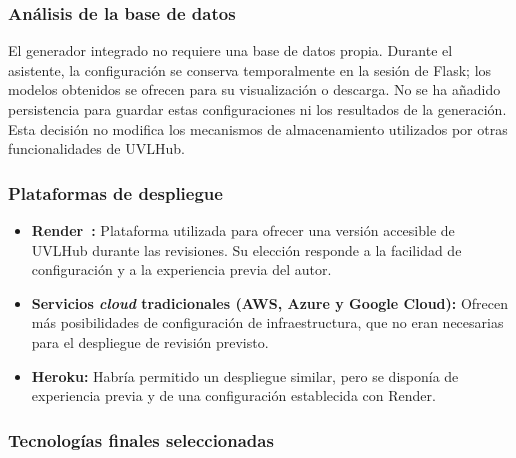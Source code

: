\subsubsection*{Análisis de la base de datos}

El generador integrado no requiere una base de datos propia. Durante el
asistente, la configuración se conserva temporalmente en la sesión de Flask;
los modelos obtenidos se ofrecen para su visualización o descarga. No se ha
añadido persistencia para guardar estas configuraciones ni los resultados de
la generación. Esta decisión no modifica los mecanismos de almacenamiento
utilizados por otras funcionalidades de UVLHub.

\subsubsection*{Plataformas de despliegue}

\begin{itemize}
    \item \textbf{Render~\cite{render}:} Plataforma utilizada para ofrecer una
    versión accesible de UVLHub durante las revisiones. Su elección responde a
    la facilidad de configuración y a la experiencia previa del autor.

    \item \textbf{Servicios \textit{cloud} tradicionales (AWS, Azure y Google
    Cloud):} Ofrecen más posibilidades de configuración de infraestructura,
    que no eran necesarias para el despliegue de revisión previsto.

    \item \textbf{Heroku:} Habría permitido un despliegue similar, pero se
    disponía de experiencia previa y de una configuración establecida con
    Render.
\end{itemize}

\subsubsection*{Tecnologías finales seleccionadas}

